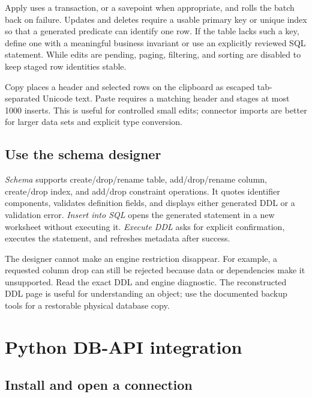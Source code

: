 Apply uses a transaction, or a savepoint when appropriate, and rolls the batch back on failure. Updates and deletes require a usable primary key or unique index so that a generated predicate can identify one row. If the table lacks such a key, define one with a meaningful business invariant or use an explicitly reviewed SQL statement. While edits are pending, paging, filtering, and sorting are disabled to keep staged row identities stable.

Copy places a header and selected rows on the clipboard as escaped tab-separated Unicode text. Paste requires a matching header and stages at most 1000 inserts. This is useful for controlled small edits; connector imports are better for larger data sets and explicit type conversion.

\subsection{Use the schema designer}

\emph{Schema} supports create/drop/rename table, add/drop/rename column, create/drop index, and add/drop constraint operations. It quotes identifier components, validates definition fields, and displays either generated DDL or a validation error. \emph{Insert into SQL} opens the generated statement in a new worksheet without executing it. \emph{Execute DDL} asks for explicit confirmation, executes the statement, and refreshes metadata after success.

The designer cannot make an engine restriction disappear. For example, a requested column drop can still be rejected because data or dependencies make it unsupported. Read the exact DDL and engine diagnostic. The reconstructed DDL page is useful for understanding an object; use the documented backup tools for a restorable physical database copy.


\section{Python DB-API integration}
\subsection{Install and open a connection}

